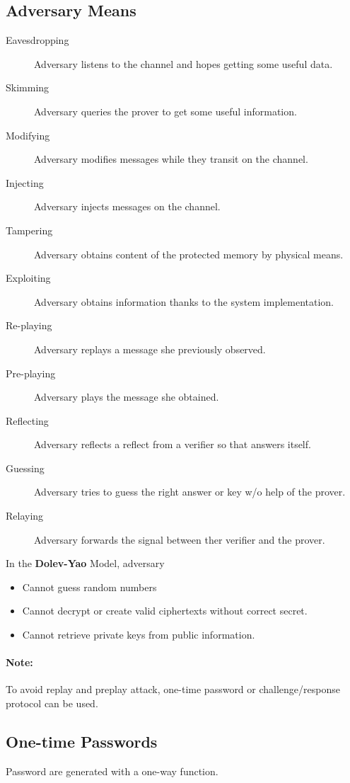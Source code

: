 \subsection{Adversary Means}
\begin{description}
    \item[Eavesdropping] Adversary listens to the channel and hopes getting some
    useful data.
    \item[Skimming] Adversary queries the prover to get some useful information.
    \item[Modifying] Adversary modifies messages while they transit on the
    channel.
    \item[Injecting] Adversary injects messages on the channel.
    \item[Tampering] Adversary obtains content of the protected memory by
    physical means.
    \item[Exploiting] Adversary obtains information thanks to the system
    implementation.
    \item[Re-playing] Adversary replays a message she previously observed.
    \item[Pre-playing] Adversary plays the message she obtained.
    \item[Reflecting] Adversary reflects a reflect from a verifier so that
    answers itself.
    \item[Guessing] Adversary tries to guess the right answer or key w/o help of
    the prover.
    \item[Relaying] Adversary forwards the signal between ther verifier and the
    prover.
\end{description}
In the \textbf{Dolev-Yao} Model, adversary
\begin{itemize}
    \item Cannot guess random numbers
    \item Cannot decrypt or create valid ciphertexts without correct secret.
    \item Cannot retrieve private keys from public information.
\end{itemize}
\paragraph{Note:} To avoid replay and preplay attack, one-time password or
challenge/response protocol can be used.

\subsection{One-time Passwords}
Password are generated with a one-way function.

